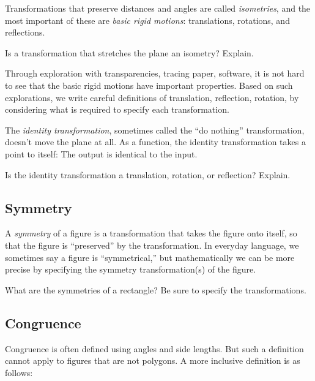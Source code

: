 \begin{definition}
Transformations that preserve distances and angles are called \emph{isometries}, and the most important of these are \emph{basic rigid motions}: translations, rotations, and reflections.  
\end{definition}

\begin{question}
Is a transformation that stretches the plane an isometry?  Explain.  
\end{question}
\QM

Through exploration with transparencies, tracing paper, software, it is not hard to see that the basic rigid motions have important properties.     Based on such explorations, we write careful definitions of translation, reflection, rotation, by considering what is required to specify each transformation.

\begin{definition}
The \emph{identity transformation}, sometimes called the ``do nothing'' transformation, doesn't move the plane at all.  As a function, the identity transformation takes a point to itself: The output is identical to the input.
\end{definition}

\begin{question}
Is the identity transformation a translation, rotation, or reflection?  Explain.  
\end{question}
\QM 

\subsection{Symmetry}
A \emph{symmetry} of a figure is a transformation that takes the figure onto itself, so that the figure is ``preserved'' by the transformation.  In everyday language, we sometimes say a figure is ``symmetrical,'' but mathematically we can be more precise by specifying the symmetry transformation(s) of the figure.  

\begin{question}
What are the symmetries of a rectangle?  Be sure to specify the transformations.  
\end{question}
\QM

\subsection{Congruence}
Congruence is often defined using angles and side lengths.  But such a definition cannot apply to figures that are not polygons.  A more inclusive definition is as follows:  


